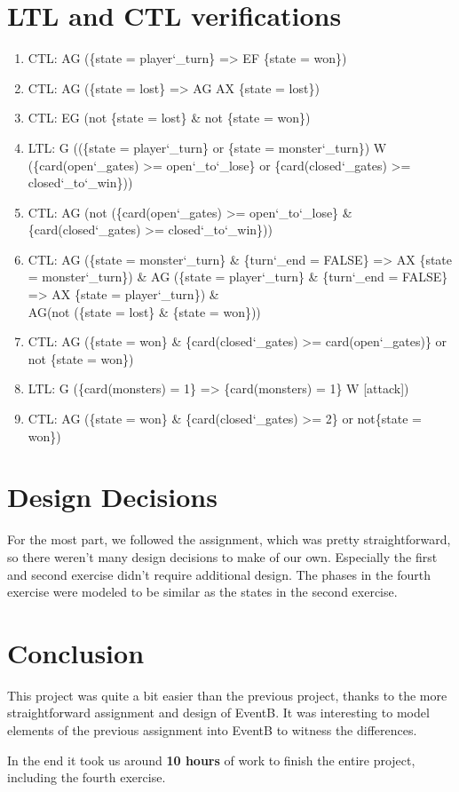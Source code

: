 \documentclass[12pt]{report}
\begin{document}
\section*{LTL and CTL verifications}
\begin{enumerate}
  \item CTL: AG (\{state = player\char`_turn\} => EF \{state = won\})
  \item CTL: AG (\{state = lost\} => AG AX \{state = lost\})
  \item CTL: EG (not \{state = lost\} \& not \{state = won\})
	\item LTL: G ((\{state = player\char`_turn\} or \{state = monster\char`_turn\}) W \\ (\{card(open\char`_gates) >= open\char`_to\char`_lose\} or \{card(closed\char`_gates) >= closed\char`_to\char`_win\}))
	\item CTL: AG (not (\{card(open\char`_gates) >= open\char`_to\char`_lose\} \& \{card(closed\char`_gates) >= closed\char`_to\char`_win\}))
	\item CTL: AG (\{state = monster\char`_turn\} \& \{turn\char`_end = FALSE\} => AX \{state = monster\char`_turn\}) \& AG (\{state = player\char`_turn\} \& \{turn\char`_end = FALSE\} => AX \{state = player\char`_turn\}) \& \\ AG(not (\{state = lost\} \& \{state = won\}))
	\item CTL: AG (\{state = won\} \& \{card(closed\char`_gates) >= card(open\char`_gates)\} or not \{state = won\}) 
	\item LTL: G (\{card(monsters) = 1\} => \{card(monsters) = 1\} W [attack])
	\item CTL: AG (\{state = won\} \& \{card(closed\char`_gates) >= 2\} or not\{state = won\})
\end{enumerate}

\section*{Design Decisions}
For the most part, we followed the assignment, which was pretty straightforward, so there weren't many design decisions to make of our own.
Especially the first and second exercise didn't require additional design. The phases in the fourth exercise were modeled to be similar as the states in the second exercise.
 

\section*{Conclusion}
This project was quite a bit easier than the previous project, thanks to the more straightforward assignment and design of EventB.
It was interesting to model elements of the previous assignment into EventB to witness the differences. 

In the end it took us around \textbf{10 hours} of work to finish the entire project, including the fourth exercise.
\end{document}
